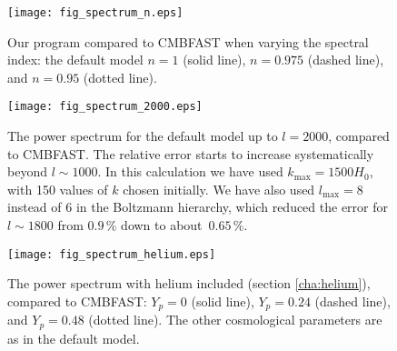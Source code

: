 \documentclass[twocolumn,nofootinbib,amsmath,amssymb]{revtex4}
\begin{document}
\begin{widetext}
\begin{figure}[!h]
  \begin{center}
    \texttt{[image: fig\_spectrum\_n.eps]}
  \end{center}
  \vspace{-6mm}
  \caption{Our program compared to CMBFAST when varying the spectral index: the
  default model $n = 1$ (solid line), $n = 0.975$ (dashed line), and $n = 0.95$
  (dotted line).}
  \label{fig:powerspectrum4}
\end{figure}
\begin{figure}[!h]
  \begin{center}
    \texttt{[image: fig\_spectrum\_2000.eps]}
  \end{center}
  \vspace{-6mm}
  \caption{The power spectrum for the default model up to $l=2000$, compared to
  CMBFAST. The relative error starts to increase systematically beyond
  $l \sim 1000$. In this calculation we have used $k_{\max} = 1500 H_0$, with
  150 values of $k$ chosen initially. We have also used $l_{\max} = 8$ instead
  of $6$ in the Boltzmann hierarchy, which reduced the error for $l \sim 1800$
  from $0.9 \,\%$ down to about~$0.65 \,\%$.}
  \label{fig:powerspectrum2000}
\end{figure}
\begin{figure}[!h]
  \begin{center}
    \texttt{[image: fig\_spectrum\_helium.eps]}
  \end{center}
  \vspace{-6mm}
  \caption{The power spectrum with helium included (section \ref{cha:helium}),
  compared to CMBFAST: $Y_p = 0$ (solid line), $Y_p = 0.24$ (dashed line), and
  $Y_p = 0.48$ (dotted line). The other cosmological parameters are as in the
  default model.}
  \label{fig:powerspectrum_helium}
\end{figure}

\clearpage


\end{widetext}
\end{document}
